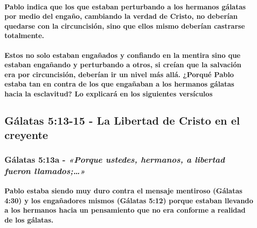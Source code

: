 \documentclass[11a pt,twoside]{article}
\newcommand{\scripture}[1]{%
  {\fontsize{12pt}{16pt}\selectfont\ScriptureFont\itshape #1}%
}
\let\oldsubsection\subsection
\renewcommand{\subsection}{\needspace{5\baselineskip}\oldsubsection}
\let\oldsubsubsection\subsubsection
\renewcommand{\subsubsection}{\needspace{4\baselineskip}\oldsubsubsection}
\let\oldparagraph\paragraph
\renewcommand{\paragraph}{\needspace{3\baselineskip}\oldparagraph}
\begin{document}
\paragraph{Pablo indica que los que estaban perturbando a los hermanos
gálatas por medio del engaño, cambiando la verdad de Cristo, no deberían
quedarse con la circuncisión, sino que ellos mismo deberían castrarse
totalmente.}\label{pablo-indica-que-los-que-estaban-perturbando-a-los-hermanos-guxe1latas-por-medio-del-engauxf1o-cambiando-la-verdad-de-cristo-no-deberuxedan-quedarse-con-la-circuncisiuxf3n-sino-que-ellos-mismo-deberuxedan-castrarse-totalmente.}

\paragraph{Estos no solo estaban engañados y confiando en la mentira
sino que estaban engañando y perturbando a otros, si creían que la
salvación era por circuncisión, deberían ir un nivel más allá. ¿Porqué
Pablo estaba tan en contra de los que engañaban a los hermanos gálatas
hacia la esclavitud? Lo explicará en los siguientes
versículos}\label{estos-no-solo-estaban-engauxf1ados-y-confiando-en-la-mentira-sino-que-estaban-engauxf1ando-y-perturbando-a-otros-si-creuxedan-que-la-salvaciuxf3n-era-por-circuncisiuxf3n-deberuxedan-ir-un-nivel-muxe1s-alluxe1.-porquuxe9-pablo-estaba-tan-en-contra-de-los-que-engauxf1aban-a-los-hermanos-guxe1latas-hacia-la-esclavitud-lo-explicaruxe1-en-los-siguientes-versuxedculos}

\subsection{Gálatas 5:13-15 - La Libertad de Cristo en el
creyente}\label{guxe1latas-513-15---la-libertad-de-cristo-en-el-creyente}

\subsubsection{\texorpdfstring{Gálatas 5:13a -
\scripture{«Porque ustedes, hermanos, a libertad fueron llamados;…»}}{Gálatas 5:13a - }}\label{guxe1latas-513a---porque-ustedes-hermanos-a-libertad-fueron-llamados}

\paragraph{Pablo estaba siendo muy duro contra el mensaje mentiroso
(Gálatas 4:30) y los engañadores mismos (Gálatas 5:12) porque estaban
llevando a los hermanos hacia un pensamiento que no era conforme a
realidad de los
gálatas.}\label{pablo-estaba-siendo-muy-duro-contra-el-mensaje-mentiroso-guxe1latas-430-y-los-engauxf1adores-mismos-guxe1latas-512-porque-estaban-llevando-a-los-hermanos-hacia-un-pensamiento-que-no-era-conforme-a-realidad-de-los-guxe1latas.}
\end{document}
